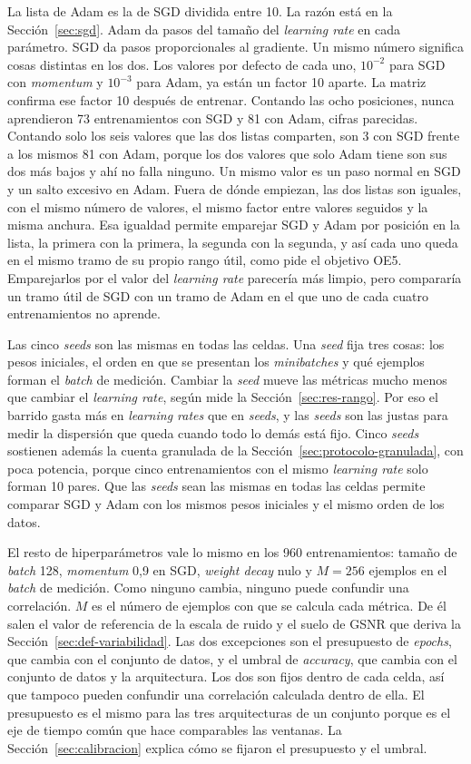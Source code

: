 La lista de Adam es la de SGD dividida entre 10. La razón está en la Sección~\ref{sec:sgd}. Adam da pasos del tamaño del \emph{learning rate} en cada parámetro. SGD da pasos proporcionales al gradiente. Un mismo número significa cosas distintas en los dos. Los valores por defecto de cada uno, $10^{-2}$ para SGD con \emph{momentum} y $10^{-3}$ para Adam, ya están un factor 10 aparte. La matriz confirma ese factor 10 después de entrenar. Contando las ocho posiciones, nunca aprendieron 73 entrenamientos con SGD y 81 con Adam, cifras parecidas. Contando solo los seis valores que las dos listas comparten, son 3 con SGD frente a los mismos 81 con Adam, porque los dos valores que solo Adam tiene son sus dos más bajos y ahí no falla ninguno. Un mismo valor es un paso normal en SGD y un salto excesivo en Adam. Fuera de dónde empiezan, las dos listas son iguales, con el mismo número de valores, el mismo factor entre valores seguidos y la misma anchura. Esa igualdad permite emparejar SGD y Adam por posición en la lista, la primera con la primera, la segunda con la segunda, y así cada uno queda en el mismo tramo de su propio rango útil, como pide el objetivo OE5. Emparejarlos por el valor del \emph{learning rate} parecería más limpio, pero compararía un tramo útil de SGD con un tramo de Adam en el que uno de cada cuatro entrenamientos no aprende.

Las cinco \emph{seeds} son las mismas en todas las celdas. Una \emph{seed} fija tres cosas: los pesos iniciales, el orden en que se presentan los \emph{minibatches} y qué ejemplos forman el \emph{batch} de medición. Cambiar la \emph{seed} mueve las métricas mucho menos que cambiar el \emph{learning rate}, según mide la Sección~\ref{sec:res-rango}. Por eso el barrido gasta más en \emph{learning rates} que en \emph{seeds}, y las \emph{seeds} son las justas para medir la dispersión que queda cuando todo lo demás está fijo. Cinco \emph{seeds} sostienen además la cuenta granulada de la Sección~\ref{sec:protocolo-granulada}, con poca potencia, porque cinco entrenamientos con el mismo \emph{learning rate} solo forman 10 pares. Que las \emph{seeds} sean las mismas en todas las celdas permite comparar SGD y Adam con los mismos pesos iniciales y el mismo orden de los datos.

El resto de hiperparámetros vale lo mismo en los 960 entrenamientos: tamaño de \emph{batch} 128, \emph{momentum} 0,9 en SGD, \emph{weight decay} nulo y $M = 256$ ejemplos en el \emph{batch} de medición. Como ninguno cambia, ninguno puede confundir una correlación. $M$ es el número de ejemplos con que se calcula cada métrica. De él salen el valor de referencia de la escala de ruido y el suelo de GSNR que deriva la Sección~\ref{sec:def-variabilidad}. Las dos excepciones son el presupuesto de \emph{epochs}, que cambia con el conjunto de datos, y el umbral de \emph{accuracy}, que cambia con el conjunto de datos y la arquitectura. Los dos son fijos dentro de cada celda, así que tampoco pueden confundir una correlación calculada dentro de ella. El presupuesto es el mismo para las tres arquitecturas de un conjunto porque es el eje de tiempo común que hace comparables las ventanas. La Sección~\ref{sec:calibracion} explica cómo se fijaron el presupuesto y el umbral.

